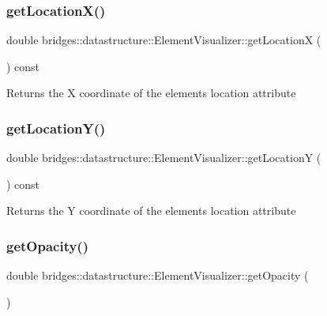\subsubsection{\texorpdfstring{get\+Location\+X()}{getLocationX()}}
{\footnotesize\ttfamily double bridges\+::datastructure\+::\+Element\+Visualizer\+::get\+LocationX (\begin{DoxyParamCaption}{ }\end{DoxyParamCaption}) const\hspace{0.3cm}{\ttfamily [inline]}}

\begin{DoxyReturn}{Returns}
the X coordinate of the element\textquotesingle{}s location attribute 
\end{DoxyReturn}
\mbox{\label{classbridges_1_1datastructure_1_1_element_visualizer_a6012c9545e56e6210b6a6485873a5c92}} 
\subsubsection{\texorpdfstring{get\+Location\+Y()}{getLocationY()}}
{\footnotesize\ttfamily double bridges\+::datastructure\+::\+Element\+Visualizer\+::get\+LocationY (\begin{DoxyParamCaption}{ }\end{DoxyParamCaption}) const\hspace{0.3cm}{\ttfamily [inline]}}

\begin{DoxyReturn}{Returns}
the Y coordinate of the element\textquotesingle{}s location attribute 
\end{DoxyReturn}
\mbox{\label{classbridges_1_1datastructure_1_1_element_visualizer_af403e841efd1dab3669fdda2fd927f99}} 
\subsubsection{\texorpdfstring{get\+Opacity()}{getOpacity()}}
{\footnotesize\ttfamily double bridges\+::datastructure\+::\+Element\+Visualizer\+::get\+Opacity (\begin{DoxyParamCaption}{ }\end{DoxyParamCaption})\hspace{0.3cm}{\ttfamily [inline]}}



